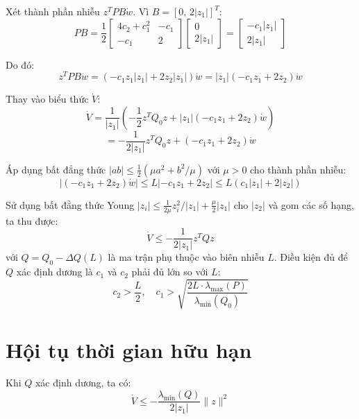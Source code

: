 \documentclass[12pt,a4paper]{report}
\begin{document}
Xét thành phần nhiễu $z^T P B \dot{w}$. Vì $B = [0, \, 2|z_1|]^T$:
\begin{equation}
PB = \frac{1}{2} \begin{bmatrix} 4c_2 + c_1^2 & -c_1 \\ -c_1 & 2 \end{bmatrix} \begin{bmatrix} 0 \\ 2|z_1| \end{bmatrix}
= \begin{bmatrix} -c_1 |z_1| \\ 2|z_1| \end{bmatrix}
\end{equation}

Do đó:
\begin{equation}
z^T P B \dot{w} = (-c_1 z_1 |z_1| + 2 z_2 |z_1|) \dot{w} = |z_1|(-c_1 z_1 + 2z_2) \dot{w}
\end{equation}

Thay vào biểu thức $\dot{V}$:
\begin{equation}
\dot{V} = \frac{1}{|z_1|} \left( -\frac{1}{2} z^T Q_0 z + |z_1|(-c_1 z_1 + 2z_2)\dot{w} \right)
\end{equation}
\begin{equation}
= -\frac{1}{2|z_1|} z^T Q_0 z + (-c_1 z_1 + 2z_2)\dot{w}
\end{equation}

Áp dụng bất đẳng thức $|ab| \le \frac{1}{2}(\mu a^2 + b^2/\mu)$ với $\mu > 0$ cho thành phần nhiễu:
\begin{equation}
|(-c_1 z_1 + 2z_2)\dot{w}| \le L |{-c_1 z_1 + 2z_2}| \le L(c_1 |z_1| + 2|z_2|)
\end{equation}

Sử dụng bất đẳng thức Young $|z_i| \le \frac{1}{2\mu}z_i^2 / |z_1| + \frac{\mu}{2}|z_1|$ cho $|z_2|$ và gom các số hạng, ta thu được:
\begin{equation}
\dot{V} \le -\frac{1}{2|z_1|} z^T Q z
\end{equation}
với $Q = Q_0 - \Delta Q(L)$ là ma trận phụ thuộc vào biên nhiễu $L$. Điều kiện đủ để $Q$ xác định dương là $c_1$ và $c_2$ phải đủ lớn so với $L$:
\begin{equation}
c_2 > \frac{L}{2}, \quad c_1 > \sqrt{\frac{2L \cdot \lambda_{\max}(P)}{\lambda_{\min}(Q_0)}}
\end{equation}

\section{Hội tụ thời gian hữu hạn}
Khi $Q$ xác định dương, ta có:
\begin{equation}
\dot{V} \le -\frac{\lambda_{\min}(Q)}{2|z_1|} \|z\|^2
\end{equation}
\end{document}
